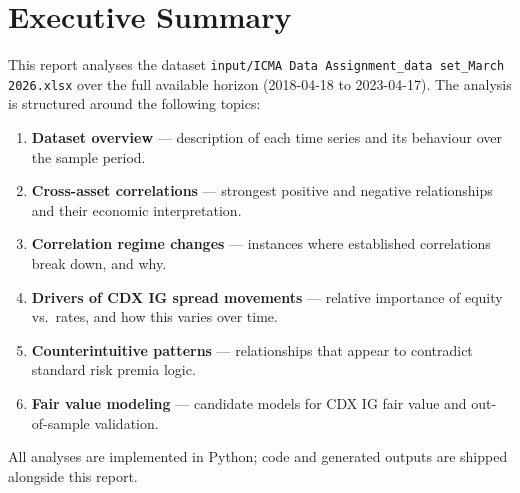 \section{Executive Summary}
This report analyses the dataset \texttt{input/ICMA Data Assignment\_data set\_March 2026.xlsx} over the full available horizon (2018-04-18 to 2023-04-17). The analysis is structured around the following topics:
\begin{enumerate}
  \item \textbf{Dataset overview} --- description of each time series and its behaviour over the sample period.
  \item \textbf{Cross-asset correlations} --- strongest positive and negative relationships and their economic interpretation.
  \item \textbf{Correlation regime changes} --- instances where established correlations break down, and why.
  \item \textbf{Drivers of CDX IG spread movements} --- relative importance of equity vs.\ rates, and how this varies over time.
  \item \textbf{Counterintuitive patterns} --- relationships that appear to contradict standard risk premia logic.
  \item \textbf{Fair value modeling} --- candidate models for CDX IG fair value and out-of-sample validation.
\end{enumerate}
All analyses are implemented in Python; code and generated outputs are shipped alongside this report.
